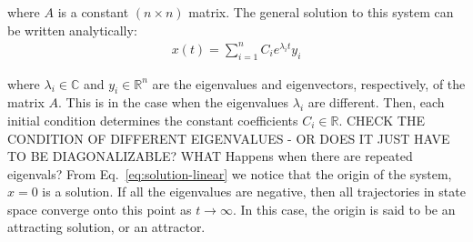 where $A$ is a constant $(n \times n)$ matrix. The general solution to this system can be written analytically:
%
\begin{align}\label{eq:solution-linear}
    x(t) = \sum_{i=1}^n C_i e^{\lambda_i t} y_i
\end{align}

where $\lambda_i \in \mathbb{C}$ and $y_i \in \mathbb{R}^n$ are the eigenvalues and eigenvectors, respectively, of the matrix $A$. This is in the case when the eigenvalues $\lambda_i$ are different. Then, each initial condition determines the constant coefficients $C_i \in \mathbb{R}$. CHECK THE CONDITION OF DIFFERENT EIGENVALUES - OR DOES IT JUST HAVE TO BE DIAGONALIZABLE? WHAT Happens when there are repeated eigenvals?
From Eq.~\ref{eq:solution-linear} we notice that the origin of the system, $x = 0$ is a solution. If all the eigenvalues are negative, then all trajectories in state space converge onto this point as $t \to \infty$. In this case, the origin is said to be an attracting solution, or an attractor. 